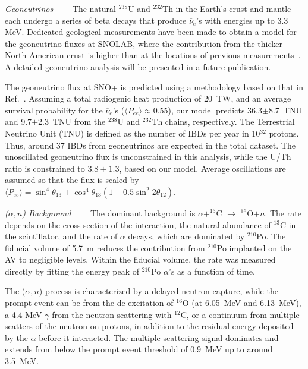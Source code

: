 \documentclass[%
 reprint,
superscriptaddress,
 amsmath,amssymb,
 aps,
]{revtex4-2}
\newcommand{\nuebars}{$\overline{\nu}_{e}$'s }
\newcommand{\alphan}{($\alpha, n$) }
\begin{document}
\smallskip
\textit{Geoneutrinos}~~\textemdash~~
The natural $^{238}$U and $^{232}$Th in the Earth's crust and mantle each undergo a series of beta decays that produce \nuebars with energies up to 3.3 MeV.  Dedicated geological measurements have been made to obtain a model for the geoneutrino fluxes at SNOLAB, where the contribution from the thicker North American crust is higher than at the locations of previous measurements~\cite{geo-local}. A detailed geoneutrino analysis will be presented in a future publication. 

The geoneutrino flux at SNO+ is predicted using a methodology based on that in Ref.~\cite{Wipperfurth:2019idn,Wipperfurth:2018}. 
Assuming a total radiogenic heat production of 20~TW, and an average survival probability for the \nuebars 
($\langle P_{ee}\rangle \approx 0.55$), our model predicts 36.3$\pm$8.7~TNU and 9.7$\pm$2.3~TNU from the $^{238}$U and $^{232}$Th chains, respectively. The Terrestrial Neutrino Unit (TNU) is defined as the number of IBDs per year in 10$^{32}$ protons.  Thus, around 37 IBDs from geoneutrinos are expected in the total dataset.  
The unoscillated geoneutrino flux is unconstrained in this analysis, while the U/Th ratio is constrained to $3.8\pm1.3$, based on our model. 
Average oscillations are assumed so that the flux is scaled by $\langle P_{ee} \rangle = \sin^4{\theta_{13}}+\cos^4{\theta_{13}}(1-0.5\sin^2{2\theta_{12}}) $. 

\smallskip
\textit{\alphan Background}~~\textemdash~~
The dominant background is $\alpha + ^{13}$C $\to$ $^{16}$O$ + n$.  The rate depends on the cross section of the interaction, the natural abundance of $^{13}$C in the scintillator, and the rate of $\alpha$ decays, which are dominated by $^{210}$Po. The fiducial volume of 5.7~m reduces the contribution from $^{210}$Po implanted on the AV to negligible levels.  Within the fiducial volume, the rate was measured directly by fitting the energy peak of $^{210}$Po $\alpha$'s as a function of time. 

The \alphan process is characterized by a delayed neutron capture, while the prompt event can be from the de-excitation of $^{16}$O (at 6.05~MeV and 6.13~MeV), a 4.4-MeV $\gamma$ from the neutron scattering with $^{12}$C, or a continuum from multiple scatters of the neutron on protons, in addition to the residual energy deposited by the $\alpha$ before it interacted. The multiple scattering signal dominates and extends from below the prompt event threshold of 0.9~MeV up to around 3.5~MeV. 
\end{document}
